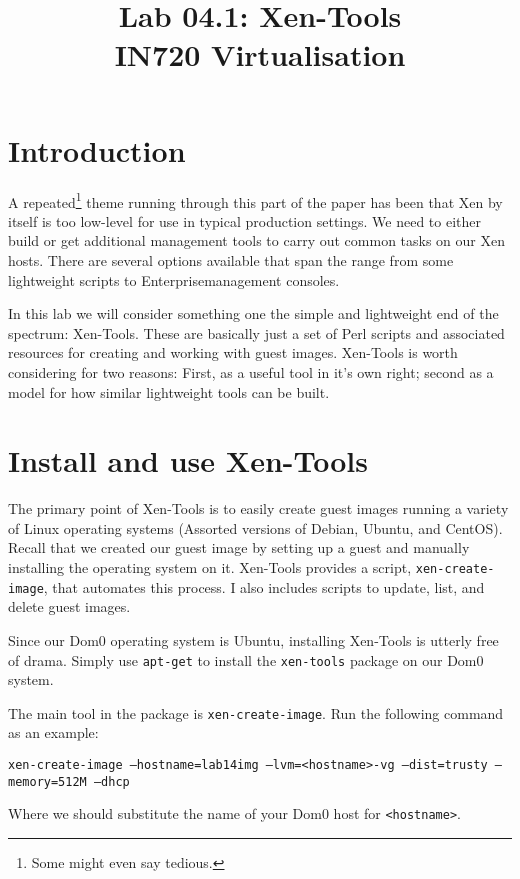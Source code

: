 \documentclass{article}
\begin{document}
\title{Lab 04.1: Xen-Tools\\ IN720 Virtualisation}
\date{}
\maketitle

\section*{Introduction}
A repeated\footnote{Some might even say tedious.} theme running through this part of the paper has been that Xen
by itself is too low-level for use in typical production settings. We need to either build or get additional management 
tools to carry out common tasks on our Xen hosts. There are several options available that span the range from some 
lightweight scripts to Enterprise\texttrademark management consoles.

In this lab we will consider something one the simple and lightweight end of the spectrum: Xen-Tools. These are basically just a set of Perl scripts and associated resources for creating and working with guest images. Xen-Tools is worth considering for two reasons: First, as a useful tool in it's own right; second as a model for how similar lightweight tools can be built.

\section{Install and use Xen-Tools}
The primary point of Xen-Tools is to easily create guest images running a variety of Linux operating
systems (Assorted versions of Debian, Ubuntu, and CentOS). Recall that we created our guest image 
by setting up a guest and manually installing the operating system on it. Xen-Tools provides a script,
\texttt{xen-create-image}, that automates this process. I also includes scripts to update, list, and delete 
guest images.

Since our Dom0 operating system is Ubuntu, installing Xen-Tools is utterly free of drama. Simply use 
\texttt{apt-get} to install the \texttt{xen-tools} package on our Dom0 system.

The main tool in the package is \texttt{xen-create-image}. Run the following command as an example:

\texttt{xen-create-image  --hostname=lab14img --lvm=<hostname>-vg --dist=trusty --memory=512M --dhcp}

Where we should substitute the name of your Dom0 host for \texttt{<hostname>}.
\end{document}
